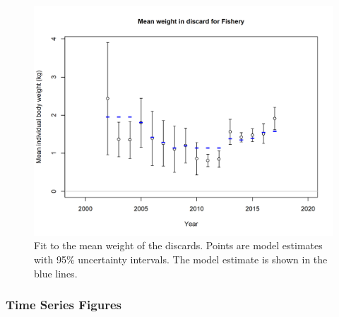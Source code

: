 \documentclass[12pt,]{article}
\begin{document}
\begin{figure}
\centering
\includegraphics{r4ss/plots_mod1/bodywt_fit_fltFishery.png}
\caption{Fit to the mean weight of the discards. Points are model
estimates with 95\% uncertainty intervals. The model estimate is shown
in the blue lines.\label{fig:bodywt_fit_fltFishery}}
\end{figure}

\FloatBarrier

\newpage

\hypertarget{time-series-figures}{%
\subsubsection{Time Series Figures}\label{time-series-figures}}

\FloatBarrier

\vspace{2.5cm}
\end{document}
